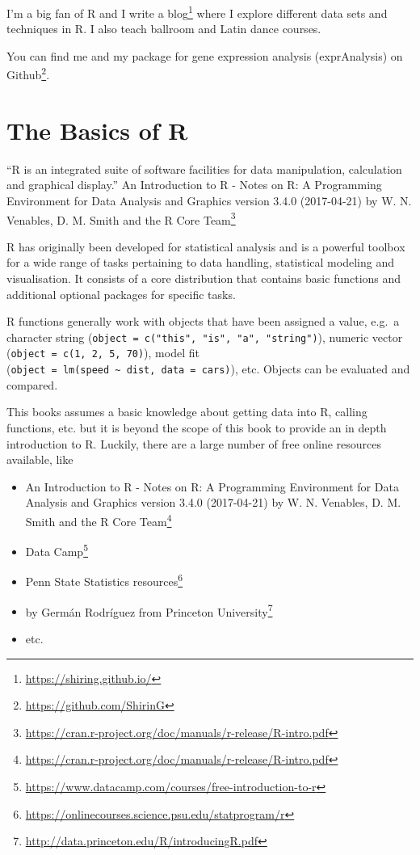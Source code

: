 \documentclass[12pt,]{krantz}
\providecommand{\tightlist}{%
  \setlength{\itemsep}{0pt}\setlength{\parskip}{0pt}}
\renewenvironment{quote}{\begin{VF}}{\end{VF}}
\renewcommand{\href}[2]{#2\footnote{\url{#1}}}
\theoremstyle{definition}
\theoremstyle{definition}
\theoremstyle{remark}
\begin{document}
I'm a big fan of R and I write \href{https://shiring.github.io/}{a blog}
where I explore different data sets and techniques in R. I also teach
ballroom and Latin dance courses.

You can find me and my package for gene expression analysis
(exprAnalysis) on \href{https://github.com/ShirinG}{Github}.

\chapter*{The Basics of R}\label{the-basics-of-r}


\begin{quote}
``R is an integrated suite of software facilities for data manipulation,
calculation and graphical display.''
\href{https://cran.r-project.org/doc/manuals/r-release/R-intro.pdf}{An
Introduction to R - Notes on R: A Programming Environment for Data
Analysis and Graphics version 3.4.0 (2017-04-21) by W. N. Venables, D.
M. Smith and the R Core Team}
\end{quote}

R has originally been developed for statistical analysis and is a
powerful toolbox for a wide range of tasks pertaining to data handling,
statistical modeling and visualisation. It consists of a core
distribution that contains basic functions and additional optional
packages for specific tasks.

R functions generally work with objects that have been assigned a value,
e.g.~a character string
(\texttt{object\ =\ c("this",\ "is",\ "a",\ "string")}), numeric vector
(\texttt{object\ =\ c(1,\ 2,\ 5,\ 70)}), model fit
(\texttt{object\ =\ lm(speed\ \textasciitilde{}\ dist,\ data\ =\ cars)}),
etc. Objects can be evaluated and compared.

This books assumes a basic knowledge about getting data into R, calling
functions, etc. but it is beyond the scope of this book to provide an in
depth introduction to R. Luckily, there are a large number of free
online resources available, like

\begin{itemize}
\tightlist
\item
  \href{https://cran.r-project.org/doc/manuals/r-release/R-intro.pdf}{An
  Introduction to R - Notes on R: A Programming Environment for Data
  Analysis and Graphics version 3.4.0 (2017-04-21) by W. N. Venables, D.
  M. Smith and the R Core Team}
\item
  \href{https://www.datacamp.com/courses/free-introduction-to-r}{Data
  Camp}
\item
  \href{https://onlinecourses.science.psu.edu/statprogram/r}{Penn State
  Statistics resources}
\item
  \href{http://data.princeton.edu/R/introducingR.pdf}{by Germán
  Rodríguez from Princeton University}
\item
  etc.
\end{itemize}
\end{document}
